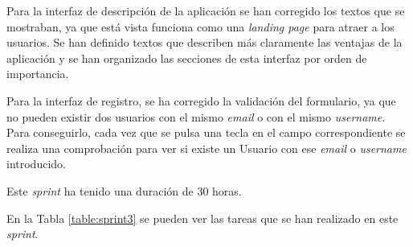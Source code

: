 Para la interfaz de descripción de la aplicación se han corregido los textos que se mostraban, ya que está vista funciona como una \textit{landing page} para atraer a los usuarios. Se han definido textos que describen más claramente las ventajas de la aplicación y se han organizado las secciones de esta interfaz por orden de importancia. 

Para la interfaz de registro, se ha corregido la validación del formulario, ya que no pueden existir dos usuarios con el mismo \textit{email} o con el mismo \textit{username}. Para conseguirlo, cada vez que se pulsa una tecla en el campo correspondiente se realiza una comprobación para ver si existe un Usuario con ese \textit{email} o \textit{username} introducido. 

Este \textit{sprint} ha tenido una duración de 30 horas.

En la Tabla \ref{table:sprint3} se pueden ver las tareas que se han realizado en este \textit{sprint}.

